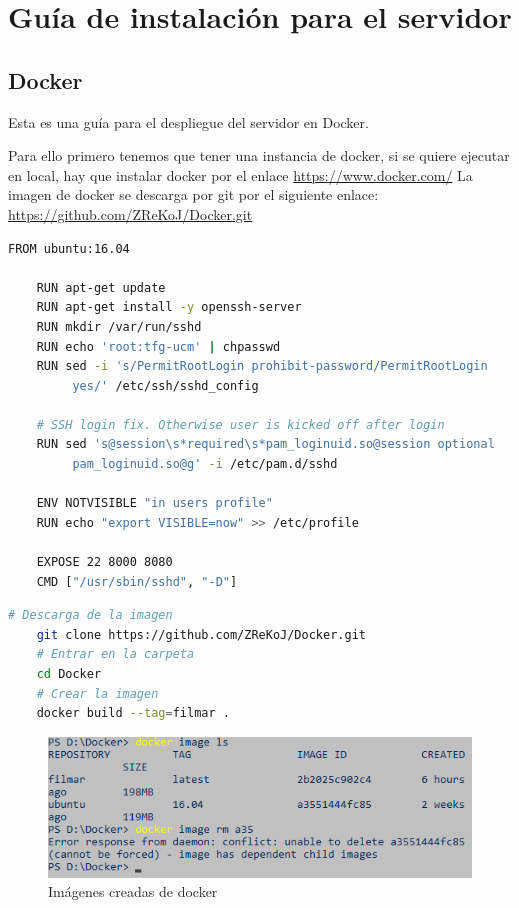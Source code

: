 
\cleardoublepage

\chapter{Guía de instalación para el servidor}
\label{Appendix:Key1}

\section{Docker}
\label{makereference7.1}
Esta es una guía para el despliegue del servidor en Docker.

Para ello primero tenemos que tener una instancia de docker, si se quiere ejecutar en local, 
hay que instalar docker por el enlace \url{https://www.docker.com/}
La imagen de docker se descarga por git por el siguiente enlace:
\url{https://github.com/ZReKoJ/Docker.git}

\begin{lstlisting}[language=bash, caption=Dockerfile]
    FROM ubuntu:16.04

    RUN apt-get update 
    RUN apt-get install -y openssh-server
    RUN mkdir /var/run/sshd
    RUN echo 'root:tfg-ucm' | chpasswd
    RUN sed -i 's/PermitRootLogin prohibit-password/PermitRootLogin
         yes/' /etc/ssh/sshd_config
    
    # SSH login fix. Otherwise user is kicked off after login
    RUN sed 's@session\s*required\s*pam_loginuid.so@session optional
         pam_loginuid.so@g' -i /etc/pam.d/sshd
    
    ENV NOTVISIBLE "in users profile"
    RUN echo "export VISIBLE=now" >> /etc/profile
    
    EXPOSE 22 8000 8080
    CMD ["/usr/sbin/sshd", "-D"]
\end{lstlisting}

\begin{lstlisting}[language=bash, caption=Descarga de la imagen de docker]
    # Descarga de la imagen
    git clone https://github.com/ZReKoJ/Docker.git 
    # Entrar en la carpeta
    cd Docker 
    # Crear la imagen
    docker build --tag=filmar . 
\end{lstlisting}

\begin{figure}[H]
    \centering
    \includegraphics[width=6in]{figures/appendix-A/list-docker-images.png}
    \caption{Imágenes creadas de docker}
\end{figure}

